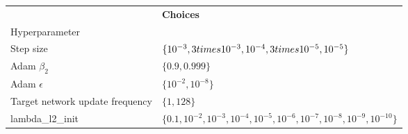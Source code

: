 \begin{tabular}{ll}
 & \bfseries Choices \\
Hyperparameter &  \\
Step size & $\{10^{-3}, 3 \\times 10^{-3}, 10^{-4}, 3 \\times 10^{-5}, 10^{-5}\}$ \\
Adam $\beta_2$ & $\{0.9, 0.999\}$ \\
Adam $\epsilon$ & $\{10^{-2}, 10^{-8}\}$ \\
Target network update frequency & $\{1, 128\}$ \\
lambda_l2_init & $\{0.1, 10^{-2}, 10^{-3}, 10^{-4}, 10^{-5}, 10^{-6}, 10^{-7}, 10^{-8}, 10^{-9}, 10^{-10}\}$ \\
\end{tabular}
